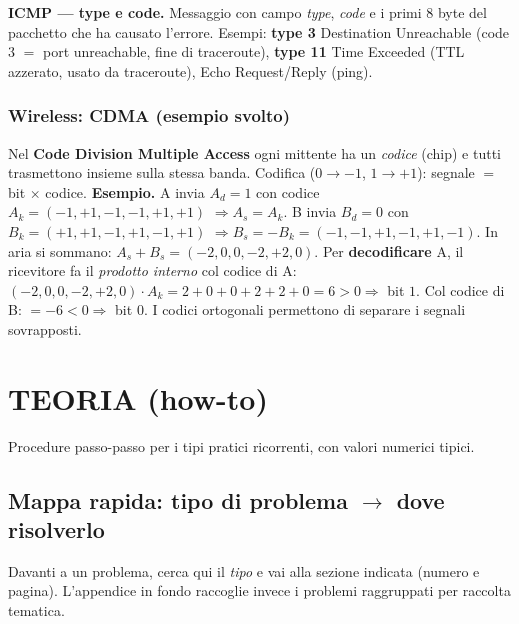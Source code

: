 \documentclass[11pt,a4paper]{report}
\begin{document}
\textbf{ICMP --- type e code.} Messaggio con campo \emph{type}, \emph{code} e i
primi 8 byte del pacchetto che ha causato l'errore. Esempi: \textbf{type 3}
Destination Unreachable (code 3 $=$ port unreachable, fine di traceroute),
\textbf{type 11} Time Exceeded (TTL azzerato, usato da traceroute), Echo
Request/Reply (ping).

\subsection*{Wireless: CDMA (esempio svolto)}
Nel \textbf{Code Division Multiple Access} ogni mittente ha un \emph{codice}
(chip) e tutti trasmettono insieme sulla stessa banda. Codifica ($0\to-1$,
$1\to+1$): segnale $=$ bit $\times$ codice. \textbf{Esempio.} A invia $A_d=1$ con
codice $A_k=(-1,+1,-1,-1,+1,+1)$ $\Rightarrow A_s=A_k$. B invia $B_d=0$ con
$B_k=(+1,+1,-1,+1,-1,+1)$ $\Rightarrow B_s=-B_k=(-1,-1,+1,-1,+1,-1)$. In aria si
sommano: $A_s+B_s=(-2,0,0,-2,+2,0)$. Per \textbf{decodificare} A, il ricevitore
fa il \emph{prodotto interno} col codice di A: $(-2,0,0,-2,+2,0)\cdot A_k =
2+0+0+2+2+0=6>0\Rightarrow$ bit $1$. Col codice di B: $=-6<0\Rightarrow$ bit $0$.
I codici ortogonali permettono di separare i segnali sovrapposti.

\appendix
\chapter{TEORIA (how-to)}
Procedure passo-passo per i tipi pratici ricorrenti, con valori numerici tipici.

\section*{Mappa rapida: tipo di problema $\to$ dove risolverlo}
Davanti a un problema, cerca qui il \emph{tipo} e vai alla sezione
indicata (numero e pagina). L'appendice in fondo raccoglie invece i problemi
raggruppati per raccolta tematica.
\end{document}
